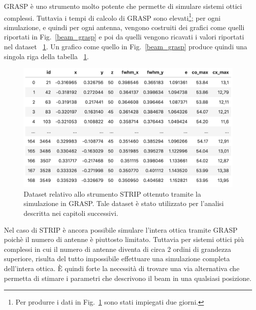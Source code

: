 \documentclass[12pt,a4paper,final]{book}
\begin{document}
GRASP è uno strumento molto potente che permette di simulare sistemi ottici complessi.
Tuttavia i tempi di calcolo di GRASP sono elevati\footnote{Per produrre i dati in Fig.~\ref{dataset} sono stati impiegati due giorni.}; per ogni simulazione, e quindi per ogni antenna, vengono costruiti dei grafici come quelli riportati in Fig.~\ref{beam_grasp} e poi da quelli vengono ricavati i valori riportati nel dataset ~\ref{dataset}.
Un grafico come quello in Fig.~\ref{beam_grasp} produce quindi una singola riga della tabella ~\ref{dataset}.

\begin{figure}[!ht]
	\centering
	\includegraphics[width=0.8\linewidth]{../figures/dataset.png}
	\caption{Dataset relativo allo strumento STRIP ottenuto tramite la simulazione in GRASP. Tale dataset è stato utilizzato per l'analisi descritta nei capitoli successivi.}
	\label{dataset}
\end{figure}

Nel caso di STRIP è ancora possibile simulare l'intera ottica tramite GRASP poichè il numero di antenne è piuttosto limitato. Tuttavia per sistemi ottici più complessi in cui il numero di antenne diventa di circa 2 ordini di grandezza superiore, risulta del tutto impossibile effettuare una simulazione completa dell'intera ottica.
\`E quindi forte la necessità di trovare una via alternativa che permetta di stimare i parametri che descrivono il beam in una qualsiasi posizione.
\end{document}
